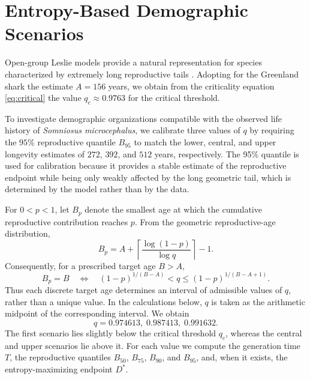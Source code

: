\documentclass[11pt,a4paper]{amsart}
\begin{document}
\section{Entropy-Based Demographic Scenarios}

Open-group Leslie models provide a natural representation for species
characterized by extremely long reproductive tails
\cite{ElaydiCushing2024}.
Adopting for the Greenland shark the 
estimate $A=156$ years,  %
we obtain 
 from the criticality equation \eqref{eq:critical} the value  
 $
q_c\approx 0.9763$ for the critical threshold. 

To investigate demographic organizations compatible with the observed life
history of \textit{Somniosus microcephalus}, we calibrate three values of \(q\) by requiring the \(95\%\) reproductive
quantile \(B_{95}\) to match the lower, central, and upper longevity
estimates of \(272\), \(392\), and \(512\) years, respectively. 
The 95\% quantile is used for calibration because it provides a stable
estimate of the reproductive endpoint while being only weakly affected
by the long geometric tail, which is determined by the model rather
than by the data.




For $0<p<1$, let $B_p$ denote the smallest age at which the
cumulative reproductive contribution reaches $p$. From the geometric
reproductive-age distribution,
\begin{equation}
B_p
=
A+\left\lceil
\frac{\log(1-p)}{\log q}
\right\rceil-1.
\label{eq:quantile-age}
\end{equation}
Consequently, for a prescribed target age $B>A$,
\begin{equation}
B_p=B
\quad\Longleftrightarrow\quad
(1-p)^{1/(B-A)}
<
q
\leq
(1-p)^{1/(B-A+1)}.
\label{eq:quantile-interval}
\end{equation}
Thus each discrete target age determines an interval of admissible
values of $q$, rather than a unique value. In the calculations below,
$q$ is taken as the arithmetic midpoint of the corresponding
interval. We obtain
\[
q=0.974613,\;0.987413,\;0.991632.
\]
The first scenario lies slightly below the critical threshold \(q_c\),
whereas the central and upper scenarios lie above it.
For each value we compute the generation time \(T\), the reproductive
quantiles \(B_{50}\), \(B_{75}\), \(B_{90}\), and \(B_{95}\), and, when it
exists, the entropy-maximizing endpoint \(D^*\).
\end{document}
